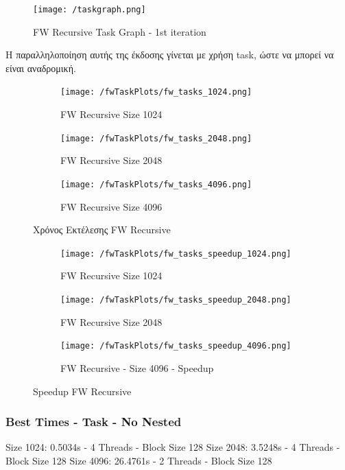 \documentclass[../final_report.tex]{subfiles}
\begin{document}
\begin{figure}[H]
    \centering
    \texttt{[image: /taskgraph.png]}
    \caption{FW Recursive Task Graph - 1st iteration}
    \label{fig:FW Recursive Task Graph}
\end{figure}

Η παραλληλοποίηση αυτής της έκδοσης γίνεται με χρήση task, ώστε να μπορεί να είναι αναδρομική.


\begin{figure}[H]
    \centering
    \begin{subfigure}[b]{0.45\linewidth}
        \texttt{[image: /fwTaskPlots/fw\_tasks\_1024.png]}
        \caption{FW Recursive Size 1024}
    \end{subfigure}
    \begin{subfigure}[b]{0.45\linewidth}
        \texttt{[image: /fwTaskPlots/fw\_tasks\_2048.png]}
        \caption{FW Recursive Size 2048}
    \end{subfigure}
    \begin{subfigure}[b]{0.5\linewidth}
        \texttt{[image: /fwTaskPlots/fw\_tasks\_4096.png]}
        \caption{FW Recursive Size 4096}
    \end{subfigure}
    \caption{Χρόνος Εκτέλεσης FW Recursive}
    \label{fig:Χρόνος Εκτέλεσης FW Recursive}
\end{figure}

\begin{figure}[H]
    \centering
    \begin{subfigure}[b]{0.48\linewidth}
        \texttt{[image: /fwTaskPlots/fw\_tasks\_speedup\_1024.png]}
        \caption{FW Recursive Size 1024}
    \end{subfigure}
    \begin{subfigure}[b]{0.48\linewidth}
        \texttt{[image: /fwTaskPlots/fw\_tasks\_speedup\_2048.png]}
        \caption{FW Recursive Size 2048}
    \end{subfigure}
    \begin{subfigure}[b]{0.5\linewidth}
        \texttt{[image: /fwTaskPlots/fw\_tasks\_speedup\_4096.png]}
        \caption{FW Recursive - Size 4096 - Speedup}
    \end{subfigure}
    \caption{Speedup FW Recursive}
    \label{fig:Speedup FW Recursive}
\end{figure}

\subsubsection*{Best Times - Task - No Nested}
Size 1024: 0.5034s - 4 Threads - Block Size 128
\newline
Size 2048: 3.5248s - 4 Threads - Block Size 128
\newline
Size 4096: 26.4761s - 2 Threads - Block Size 128
\newline
\end{document}
